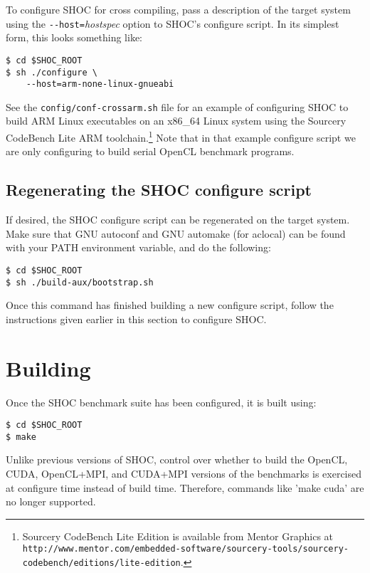 \documentclass[11pt]{article}
\begin{document}
To configure SHOC for cross compiling, pass a description of the target
system using the \verb+--host=+{\em hostspec} option to SHOC's configure
script.
In its simplest form, this looks something like:
\begin{Verbatim}[frame=single]
$ cd $SHOC_ROOT
$ sh ./configure \
    --host=arm-none-linux-gnueabi
\end{Verbatim}
\noindent See the {\tt config/conf-crossarm.sh} file for an example of 
configuring SHOC to build ARM Linux executables on an x86\_64 Linux system
using the Sourcery CodeBench Lite ARM toolchain.\footnote{Sourcery CodeBench
Lite Edition is available from Mentor Graphics at 
{\tt http://www.mentor.com/embedded-software/sourcery-tools/sourcery-codebench/editions/lite-edition}.}
Note that in that example configure script we are only configuring to build
serial OpenCL benchmark programs.



\subsection{Regenerating the SHOC configure script}

If desired, the SHOC configure script can be regenerated on the target system.
Make sure that GNU autoconf and GNU automake (for aclocal) can be found with
your PATH environment variable, and do the following:

\begin{Verbatim}[frame=single]
$ cd $SHOC_ROOT
$ sh ./build-aux/bootstrap.sh
\end{Verbatim}

Once this command has finished building a new configure script, follow the
instructions given earlier in this section to configure SHOC.


\section{Building}\label{sec:building}

Once the SHOC benchmark suite has been configured, it is built using:

\begin{Verbatim}[frame=single]
$ cd $SHOC_ROOT
$ make
\end{Verbatim}

Unlike previous versions of SHOC, control over whether to build the 
OpenCL, CUDA, OpenCL+MPI, and CUDA+MPI versions of the benchmarks is
exercised at configure time instead of build time.
Therefore, commands like 'make cuda' are no longer supported.
\end{document}
